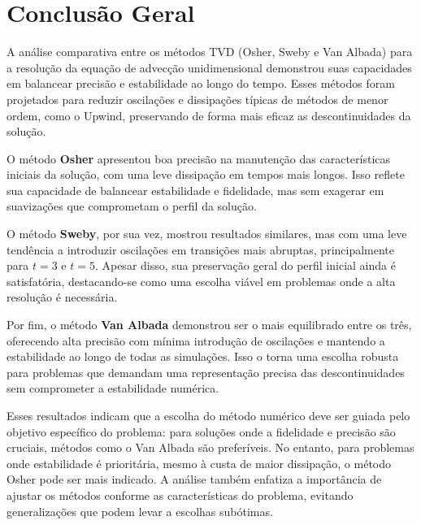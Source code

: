 \section{Conclusão Geral}

A análise comparativa entre os métodos TVD (Osher, Sweby e Van Albada) para a resolução da equação de advecção unidimensional demonstrou suas capacidades em balancear precisão e estabilidade ao longo do tempo. Esses métodos foram projetados para reduzir oscilações e dissipações típicas de métodos de menor ordem, como o Upwind, preservando de forma mais eficaz as descontinuidades da solução.

O método \textbf{Osher} apresentou boa precisão na manutenção das características iniciais da solução, com uma leve dissipação em tempos mais longos. Isso reflete sua capacidade de balancear estabilidade e fidelidade, mas sem exagerar em suavizações que comprometam o perfil da solução.

O método \textbf{Sweby}, por sua vez, mostrou resultados similares, mas com uma leve tendência a introduzir oscilações em transições mais abruptas, principalmente para \( t = 3 \) e \( t = 5 \). Apesar disso, sua preservação geral do perfil inicial ainda é satisfatória, destacando-se como uma escolha viável em problemas onde a alta resolução é necessária.

Por fim, o método \textbf{Van Albada} demonstrou ser o mais equilibrado entre os três, oferecendo alta precisão com mínima introdução de oscilações e mantendo a estabilidade ao longo de todas as simulações. Isso o torna uma escolha robusta para problemas que demandam uma representação precisa das descontinuidades sem comprometer a estabilidade numérica.

Esses resultados indicam que a escolha do método numérico deve ser guiada pelo objetivo específico do problema: para soluções onde a fidelidade e precisão são cruciais, métodos como o Van Albada são preferíveis. No entanto, para problemas onde estabilidade é prioritária, mesmo à custa de maior dissipação, o método Osher pode ser mais indicado. A análise também enfatiza a importância de ajustar os métodos conforme as características do problema, evitando generalizações que podem levar a escolhas subótimas.
